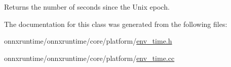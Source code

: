 Returns the number of seconds since the Unix epoch. 



The documentation for this class was generated from the following files\+:\begin{DoxyCompactItemize}
\item 
onnxruntime/onnxruntime/core/platform/\mbox{\hyperlink{env__time_8h}{env\+\_\+time.\+h}}\item 
onnxruntime/onnxruntime/core/platform/\mbox{\hyperlink{env__time_8cc}{env\+\_\+time.\+cc}}\end{DoxyCompactItemize}
